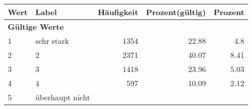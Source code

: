      \begin{longtable}{lXrrr}
     \toprule
     \textbf{Wert} & \textbf{Label} & \textbf{Häufigkeit} & \textbf{Prozent(gültig)} & \textbf{Prozent} \\
     \endhead
     \midrule
     \multicolumn{5}{l}{\textbf{Gültige Werte}}\\

     1 &
     \multicolumn{1}{X}{ sehr stark   } &


       \num{1354} &
       \num[round-mode=places,round-precision=2]{22.88} &
         \num[round-mode=places,round-precision=2]{4.8} \\

     2 &
     \multicolumn{1}{X}{ 2   } &


       \num{2371} &
       \num[round-mode=places,round-precision=2]{40.07} &
         \num[round-mode=places,round-precision=2]{8.41} \\

     3 &
     \multicolumn{1}{X}{ 3   } &


       \num{1418} &
       \num[round-mode=places,round-precision=2]{23.96} &
         \num[round-mode=places,round-precision=2]{5.03} \\

     4 &
     \multicolumn{1}{X}{ 4   } &


       \num{597} &
       \num[round-mode=places,round-precision=2]{10.09} &
         \num[round-mode=places,round-precision=2]{2.12} \\

     5 &
     \multicolumn{1}{X}{ überhaupt nicht   } &



\end{longtable}

